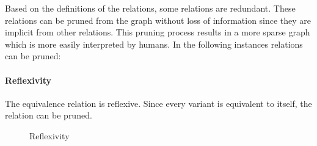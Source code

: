 Based on the definitions of the relations, some relations are redundant. 
These relations can be pruned from the graph without loss of information since they are implicit from other relations. 
This pruning process results in a more sparse graph which is more easily interpreted by humans.
In the following instances relations can be pruned:
\paragraph*{Reflexivity} The equivalence relation is reflexive. Since every variant is equivalent to itself, the relation can be pruned.
\begin{figure}
    \centering
    
    \caption{Reflexivity}
    \label{fig:reflexivity}
\end{figure}